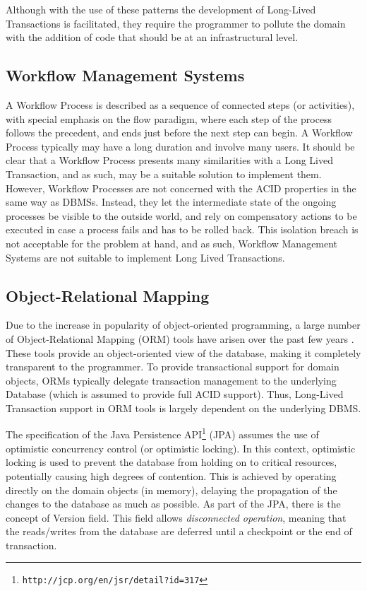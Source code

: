 \documentclass{llncs}
\begin{document}
Although with the use of these patterns the development of Long-Lived
Transactions is facilitated, they require the programmer to pollute
the domain with the addition of code that should be at an
infrastructural level.

\subsection{Workflow Management Systems}

A Workflow Process is described as a sequence of connected steps (or
activities), with special emphasis on the flow paradigm, where each
step of the process follows the precedent, and ends just before the
next step can begin. A Workflow Process typically may have a long
duration and involve many users. It should be clear that a Workflow
Process presents many similarities with a Long Lived Transaction, and
as such, may be a suitable solution to implement them. However,
Workflow Processes are not concerned with the ACID properties in the
same way as DBMSs. Instead, they let the intermediate state of the
ongoing processes be visible to the outside world, and rely on
compensatory actions to be executed in case a process fails and has to
be rolled back. This isolation breach is not acceptable for the
problem at hand, and as such, Workflow Management Systems are not
suitable to implement Long Lived Transactions.

\subsection{Object-Relational Mapping}
\label{sec:orm}

Due to the increase in popularity of object-oriented programming, a
large number of Object-Relational Mapping (ORM) tools have arisen over
the past few years \cite{orm}. These tools provide an object-oriented
view of the database, making it completely transparent to the
programmer. To provide transactional support for domain objects, ORMs
typically delegate transaction management to the underlying Database
(which is assumed to provide full ACID support). Thus, Long-Lived
Transaction support in ORM tools is largely dependent on the
underlying DBMS.

The specification of the Java Persistence
API\footnote{\texttt{http://jcp.org/en/jsr/detail?id=317}} (JPA)
assumes the use of optimistic concurrency control (or optimistic
locking). In this context, optimistic locking is used to prevent the
database from holding on to critical resources, potentially causing
high degrees of contention.  This is achieved by operating directly on
the domain objects (in memory), delaying the propagation of the
changes to the database as much as possible. As part of the JPA, there
is the concept of Version field. This field allows {\it disconnected
  operation}, meaning that the reads/writes from the database are
deferred until a checkpoint or the end of transaction.
\end{document}
